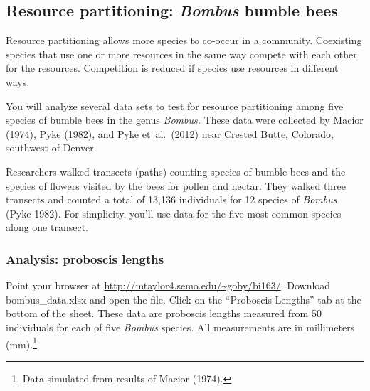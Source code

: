 \documentclass[12pt, hidelinks]{exam}
\begin{document}
\subsection*{Resource partitioning: \textit{Bombus} bumble bees}

Resource partitioning allows more species to co-occur in a community.
Coexisting species that use one or more resources in the same way compete
with each other for the resources. Competition is reduced if species
use resources in different ways.



You will analyze several data sets to test for resource partitioning among five
species of bumble bees in the genus \textit{Bombus.} These data were collected
by Macior (1974), Pyke (1982), and Pyke et~al.~(2012) near Crested Butte, Colorado,
southwest of Denver.

Researchers walked transects (paths) counting species of bumble bees and the 
species of flowers visited by the bees for pollen and nectar. They walked
three transects and counted a total of 13,136 individuals for 12 species of 
\textit{Bombus} (Pyke 1982). For simplicity, you'll use data for the five most common 
species along one transect.


\subsubsection*{Analysis: proboscis lengths}

Point your browser at \url{http://mtaylor4.semo.edu/~goby/bi163/}. Download bombus\_data.xlsx and open the file. Click on the “Proboscis Lengths” tab at the bottom of the sheet. These data are
 proboscis lengths measured from 50 individuals for each of five \textit{Bombus} species. All measurements are in millimeters (mm).\footnote{Data simulated  from results of Macior (1974).}
\end{document}
